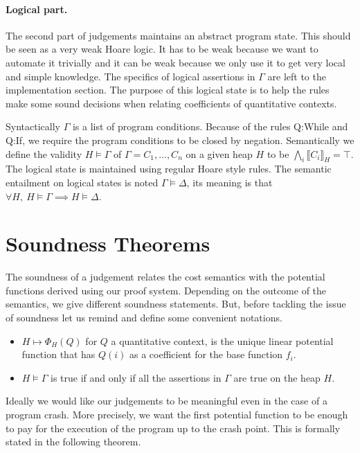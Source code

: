 \documentclass[10pt]{article}
\begin{document}
\paragraph{Logical part.}
The second part of judgements maintains an abstract program state.
This should be seen as a very weak Hoare logic.  It has to be weak because
we want to automate it trivially and it can be weak because we only use
it to get very local and simple knowledge.  The specifics of logical assertions
in $\Gamma$ are left to the implementation section.
%
The purpose of this logical state is to help the rules
make some sound decisions when relating coefficients of quantitative
contexts.

Syntactically $\Gamma$ is a list of program conditions.  Because of the
rules {\sc Q:While} and {\sc Q:If}, we require the program conditions
to be closed by negation.  Semantically we define the validity
$H \models \Gamma$ of $\Gamma = C_1, \dots, C_n$ on a given
heap $H$ to be $\bigwedge_i \llbracket C_i \rrbracket_H = \top$.
%
The logical state
is maintained using regular Hoare style rules.
The semantic entailment on logical states is noted $\Gamma \models \Delta$,
its meaning is that $\forall H,~ H\models\Gamma \implies H\models\Delta$.


\section{Soundness Theorems}

The soundness of a judgement relates the cost semantics with the potential
functions derived using our proof system.  Depending on the outcome of
the semantics, we give different soundness statements.
But, before tackling the issue of soundness let us remind and define some
convenient notations.
\begin{itemize}
\item $H \mapsto \Phi_H(Q)$ for $Q$ a quantitative context, is the
unique linear potential function that has $Q(i)$ as a coefficient for the
base function $f_i$.
\item $H \models \Gamma$ is true if and only if all the assertions in
$\Gamma$ are true on the heap $H$.
\end{itemize}

Ideally we would
like our judgements to be meaningful even in the case of a program
crash.  More precisely, we want the first potential function to be enough
to pay for the execution of the program up to the crash point.  This is
formally stated in the following theorem.
\end{document}
